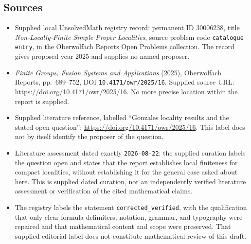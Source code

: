 \documentclass[11pt]{article}
\begin{document}
\subsection{Sources}
\begin{itemize}
\item Supplied local UnsolvedMath registry record: permanent ID \(30006238\), title \emph{Non-Locally-Finite Simple Proper Localities}, source problem code \texttt{catalogue entry}, in the Oberwolfach Reports Open Problems collection. The record gives proposed year \(2025\) and supplies no named proposer.
\item \emph{Finite Groups, Fusion Systems and Applications} (2025), Oberwolfach Reports, pp.~689--752, DOI \texttt{10.4171/owr/2025/16}. Supplied source URL: \url{https://doi.org/10.4171/owr/2025/16}. No more precise location within the report is supplied.
\item Supplied literature reference, labelled ``Gonzales locality results and the stated open question'': \url{https://doi.org/10.4171/owr/2025/16}. This label does not by itself identify the proposer of the question.
\item Literature assessment dated exactly \texttt{2026-08-22}: the supplied curation labels the question open and states that the report establishes local finiteness for compact localities, without establishing it for the general case asked about here. This is supplied dated curation, not an independently verified literature assessment or verification of the cited mathematical claims.
\item The registry labels the statement \texttt{corrected\_verified}, with the qualification that only clear formula delimiters, notation, grammar, and typography were repaired and that mathematical content and scope were preserved. That supplied editorial label does not constitute mathematical review of this draft.
\end{itemize}
\end{document}
